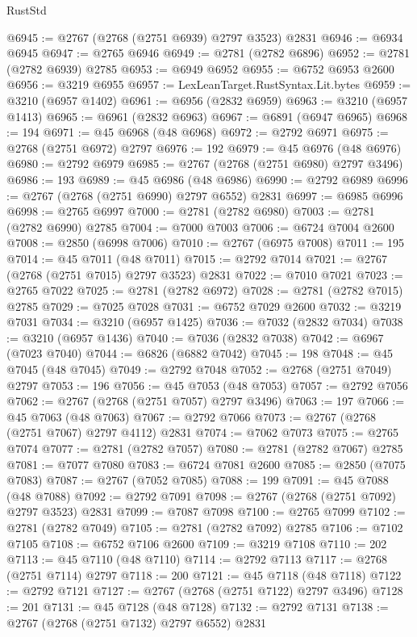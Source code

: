\begin{lexlean}{RustStd}
\begin{coremodule}
@6945 := @2767 (@2768 (@2751 @6939) @2797 @3523) @2831
@6946 := @6934 @6945
@6947 := @2765 @6946
@6949 := @2781 (@2782 @6896)
@6952 := @2781 (@2782 @6939) @2785
@6953 := @6949 @6952
@6955 := @6752 @6953 @2600
@6956 := @3219 @6955
@6957 := LexLeanTarget.RustSyntax.Lit.bytes
@6959 := @3210 (@6957 @1402)
@6961 := @6956 (@2832 @6959)
@6963 := @3210 (@6957 @1413)
@6965 := @6961 (@2832 @6963)
@6967 := @6891 (@6947 @6965)
@6968 := 194
@6971 := @45 @6968 (@48 @6968)
@6972 := @2792 @6971
@6975 := @2768 (@2751 @6972) @2797
@6976 := 192
@6979 := @45 @6976 (@48 @6976)
@6980 := @2792 @6979
@6985 := @2767 (@2768 (@2751 @6980) @2797 @3496)
@6986 := 193
@6989 := @45 @6986 (@48 @6986)
@6990 := @2792 @6989
@6996 := @2767 (@2768 (@2751 @6990) @2797 @6552) @2831
@6997 := @6985 @6996
@6998 := @2765 @6997
@7000 := @2781 (@2782 @6980)
@7003 := @2781 (@2782 @6990) @2785
@7004 := @7000 @7003
@7006 := @6724 @7004 @2600
@7008 := @2850 (@6998 @7006)
@7010 := @2767 (@6975 @7008)
@7011 := 195
@7014 := @45 @7011 (@48 @7011)
@7015 := @2792 @7014
@7021 := @2767 (@2768 (@2751 @7015) @2797 @3523) @2831
@7022 := @7010 @7021
@7023 := @2765 @7022
@7025 := @2781 (@2782 @6972)
@7028 := @2781 (@2782 @7015) @2785
@7029 := @7025 @7028
@7031 := @6752 @7029 @2600
@7032 := @3219 @7031
@7034 := @3210 (@6957 @1425)
@7036 := @7032 (@2832 @7034)
@7038 := @3210 (@6957 @1436)
@7040 := @7036 (@2832 @7038)
@7042 := @6967 (@7023 @7040)
@7044 := @6826 (@6882 @7042)
@7045 := 198
@7048 := @45 @7045 (@48 @7045)
@7049 := @2792 @7048
@7052 := @2768 (@2751 @7049) @2797
@7053 := 196
@7056 := @45 @7053 (@48 @7053)
@7057 := @2792 @7056
@7062 := @2767 (@2768 (@2751 @7057) @2797 @3496)
@7063 := 197
@7066 := @45 @7063 (@48 @7063)
@7067 := @2792 @7066
@7073 := @2767 (@2768 (@2751 @7067) @2797 @4112) @2831
@7074 := @7062 @7073
@7075 := @2765 @7074
@7077 := @2781 (@2782 @7057)
@7080 := @2781 (@2782 @7067) @2785
@7081 := @7077 @7080
@7083 := @6724 @7081 @2600
@7085 := @2850 (@7075 @7083)
@7087 := @2767 (@7052 @7085)
@7088 := 199
@7091 := @45 @7088 (@48 @7088)
@7092 := @2792 @7091
@7098 := @2767 (@2768 (@2751 @7092) @2797 @3523) @2831
@7099 := @7087 @7098
@7100 := @2765 @7099
@7102 := @2781 (@2782 @7049)
@7105 := @2781 (@2782 @7092) @2785
@7106 := @7102 @7105
@7108 := @6752 @7106 @2600
@7109 := @3219 @7108
@7110 := 202
@7113 := @45 @7110 (@48 @7110)
@7114 := @2792 @7113
@7117 := @2768 (@2751 @7114) @2797
@7118 := 200
@7121 := @45 @7118 (@48 @7118)
@7122 := @2792 @7121
@7127 := @2767 (@2768 (@2751 @7122) @2797 @3496)
@7128 := 201
@7131 := @45 @7128 (@48 @7128)
@7132 := @2792 @7131
@7138 := @2767 (@2768 (@2751 @7132) @2797 @6552) @2831

\end{coremodule}
\end{lexlean}
